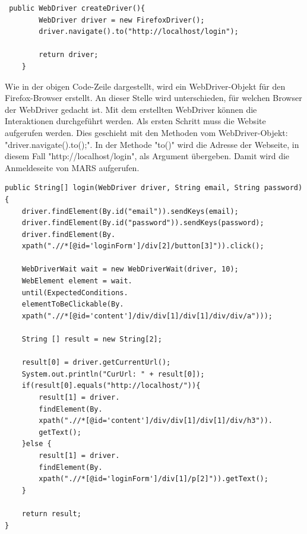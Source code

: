 \documentclass{llncs}
\begin{document}
\lstset{language = Java}
\begin{lstlisting}
 public WebDriver createDriver(){
		WebDriver driver = new FirefoxDriver();
		driver.navigate().to("http://localhost/login");
		
		return driver;
	}
\end{lstlisting}

Wie in der obigen Code-Zeile dargestellt, wird ein WebDriver-Objekt für den Firefox-Browser erstellt. An dieser Stelle wird unterschieden, für welchen Browser der WebDriver gedacht ist. Mit dem erstellten WebDriver können die Interaktionen durchgeführt werden. Als ersten Schritt muss die Website aufgerufen werden. Dies geschieht mit den Methoden vom WebDriver-Objekt: "driver.navigate().to();". In der Methode "to()" wird die Adresse der Webseite, in diesem Fall "http://localhost/login", als Argument übergeben. Damit wird die Anmeldeseite von MARS aufgerufen. 


\lstset{language = Java}
\begin{lstlisting}
public String[] login(WebDriver driver, String email, String password){
	driver.findElement(By.id("email")).sendKeys(email);
	driver.findElement(By.id("password")).sendKeys(password);
	driver.findElement(By.
	xpath(".//*[@id='loginForm']/div[2]/button[3]")).click();
		
	WebDriverWait wait = new WebDriverWait(driver, 10);
	WebElement element = wait.
	until(ExpectedConditions.
	elementToBeClickable(By.
	xpath(".//*[@id='content']/div/div[1]/div[1]/div/div/a")));
		
	String [] result = new String[2];
		
	result[0] = driver.getCurrentUrl();
	System.out.println("CurUrl: " + result[0]);
	if(result[0].equals("http://localhost/")){
		result[1] = driver.
		findElement(By.
		xpath(".//*[@id='content']/div/div[1]/div[1]/div/h3")).
		getText();
	}else {
		result[1] = driver.
		findElement(By.
		xpath(".//*[@id='loginForm']/div[1]/p[2]")).getText();
	}
		
	return result;
}
\end{lstlisting}
\end{document}
